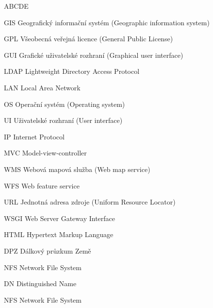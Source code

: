 
\begin{seznamzkratek}{ABCDE}      
	      
	      {GIS}
	      {Geografický informační systém (Geographic information system)}

	      {GPL}
	      {Všeobecná veřejná licence (General Public License)}
	         
	      {GUI}
	      {Grafické uživatelské rozhraní (Graphical user interface)}
	           
	      {LDAP}
	      {Lightweight Directory Access Protocol} 
	      
	      {LAN}
	      {Local Area Network} 
	      	       
	      {OS}
	      {Operační systém (Operating system)} 

	      {UI}
	      {Uživatelské rozhraní (User interface)} 
	      
	      {IP}
	      {Internet Protocol} 	      	     

	      {MVC}
	      {Model-view-controller} 	

	      {WMS}
	      {Webová mapová služba (Web map service)} 	

	      {WFS}
	      {Web feature service} 	

	      {URL}
	      {Jednotná adresa zdroje (Uniform Resource Locator)}

	      {WSGI}
	      {Web Server Gateway Interface}

	      {HTML}
	      {Hypertext Markup Language}

	      {DPZ}
	      {Dálkový průzkum Země}

	      {NFS}
	      {Network File System}

	      {DN}
	      {Distinguished Name}
	      
	      {NFS}
	      {Network File System}
	      	      
\end{seznamzkratek}